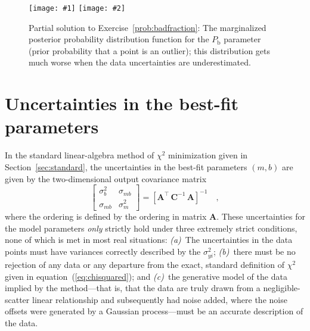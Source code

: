 \documentclass[12pt,twoside]{article}
\newcommand{\exampleplottwo}[2]{%
\begin{center}%
\texttt{[image: \#1]}%
\texttt{[image: \#2]}%
\end{center}%
}
\newcommand{\sectionname}{Section}
\newcommand{\equationname}{equation}
\newcommand{\problemname}{Exercise}
\newcounter{problem}
\newcommand{\mmatrix}[1]{\boldsymbol{#1}}
\newcommand{\inverse}[1]{{#1}^{-1}}
\newcommand{\transpose}[1]{{#1}^{\scriptscriptstyle \top}}
\newcommand{\mA}{\mmatrix{A}}
\newcommand{\mAT}{\transpose{\mA}}
\newcommand{\mC}{\mmatrix{C}}
\newcommand{\mCinv}{\inverse{\mC}}
\newcommand{\Pbad}{P_{\mathrm{b}}}
\begin{document}
\begin{figure}[htbp]
\exampleplottwo{exMix1c}{exMix2c}
\caption{Partial solution to \problemname~\ref{prob:badfraction}: The
marginalized posterior probability distribution function for the
$\Pbad$ parameter (prior probability that a point is an outlier); this
distribution gets much worse when the data uncertainties are
underestimated.}\label{fig:badfraction}
\end{figure}

\section{Uncertainties in the best-fit parameters}\label{sec:uncertainty}

In the standard linear-algebra method of $\chi^2$ minimization given
in \sectionname~\ref{sec:standard}, the uncertainties in the best-fit
parameters $(m,b)$ are given by the two-dimensional output covariance
matrix
\begin{equation}
\left[\begin{array}{cc}
\sigma_{b}^2 & \sigma_{mb} \\
\sigma_{mb} & \sigma_{m}^2
\end{array}\right] = \inverse{\left[\mAT\,\mCinv\,\mA\right]} \quad ,
\end{equation}
where the ordering is defined by the ordering in matrix $\mA$.  These
uncertainties for the model parameters \emph{only} strictly hold under
three extremely strict conditions, none of which is met in most real
situations: \textsl{(a)}~The uncertainties in the data points must
have variances correctly described by the $\sigma_{yi}^2$;
\textsl{(b)}~there must be no rejection of any data or any departure
from the exact, standard definition of $\chi^2$ given in
\equationname~(\ref{eq:chisquared}); and \textsl{(c)}~the generative
model of the data implied by the method---that is, that the data are
truly drawn from a negligible-scatter linear relationship and
subsequently had noise added, where the noise offsets were generated
by a Gaussian process---must be an accurate description of the data.
\end{document}
